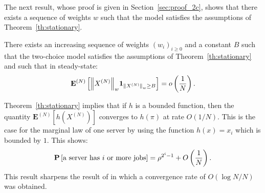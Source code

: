 \documentclass[acmlarge]{acmart}
\newcommand\XN{X^{(N)}}
\newcommand\espN[1]{{\mathchoice{\bespN{#1}}{\sespN{#1}}{\sespN{#1}}{\sespN{#1}}}}
\newcommand\bespN[1]{\mathbf{E}^{(N)}\left[#1\right]}
\newcommand\sespN[1]{\mathbf{E}^{(N)}[#1]}
\newcommand\Proba[1]{{\mathchoice{\bProba{#1}}{\sProba{#1}}{\sProba{#1}}{\sProba{#1}}}}
\newcommand\bProba[1]{\mathbf{P}\left[#1\right]}
\newcommand\sProba[1]{\mathbf{P}[#1]}
\newcommand\norm[1]{{\mathchoice{\bnorm{#1}}{\snorm{#1}}{\snorm{#1}}{\snorm{#1}}}}
\newcommand\bnorm[1]{\left\|#1\right\|}
\newcommand\snorm[1]{\|#1\|}
\newcommand\p[1]{\left(#1\right)}
\begin{document}
The next result, whose proof is given in Section~\ref{sec:proof_2c},
shows that there exists a sequence of weights $w$ such that the model
satisfies the assumptions of
Theorem~\ref{th:stationary}. 
\begin{theorem}
  \label{th:two-choice}
  There exists an increasing sequence of weights $(w_i)_{i\ge0}$ and a
  constant $B$ such that the two-choice model satisfies the
  assumptions of Theorem~\ref{th:stationary} and such that in
  steady-state:
  \begin{align}
    \label{eq:bound_2c}
    \espN{\norm{\XN}_w\mathbf{1}_{\norm{\XN}_w\ge B}}=o\p{\frac1{N}}.
  \end{align}
\end{theorem}

Theorem~\ref{th:stationary} implies that if $h$ is a bounded function,
then the quantity $\sespN{h(\XN)}$ converges to $h(\pi)$ at rate
$O(1/N)$. This is the case for the marginal law of one server by using
the function $h(x)=x_i$ which is bounded by $1$. This shows:
\begin{align*}
  \Proba{\text{a server has $i$ or more jobs}} = \rho^{2^i-1} +
  O\p{\frac1N}. 
\end{align*}
This result sharpens the result of \cite{luczak2007asymptotic} in
which a convergence rate of $O(\log N/N)$ was obtained. 
\end{document}
